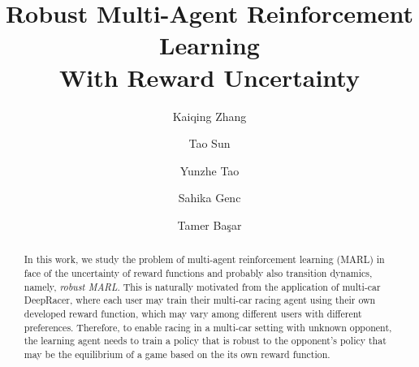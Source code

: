\documentclass{article}
\author{Kaiqing Zhang \and Tao Sun \and Yunzhe Tao \and Sahika Genc \and Tamer Ba\c{s}ar}
\begin{document}
\title{Robust Multi-Agent Reinforcement Learning\\
 With Reward Uncertainty}


\maketitle   
   
 


\begin{abstract}
In this work, we study the problem of multi-agent reinforcement learning (MARL) in face of the uncertainty of reward functions and probably also transition dynamics, namely, \emph{robust MARL}.  This is naturally motivated from the application of multi-car DeepRacer, where each user may train their multi-car racing agent using their own developed reward function, which may vary among different users with different preferences. Therefore, to enable racing in a multi-car setting with unknown opponent, the learning agent needs to train a policy that is robust to the opponent's policy that may be the equilibrium of a game based on the its own  reward function. 
\end{abstract}
 
 
 
 










% 







 

\newpage




\appendix




 
\end{document}
